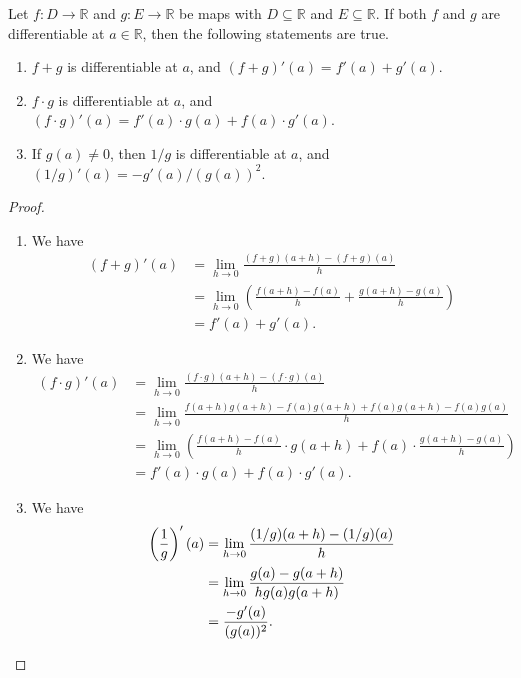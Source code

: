 \begin{theorem}
  Let $f: D \to \mathbb{R}$ and $g: E \to \mathbb{R}$ be maps with
  $D \subseteq \mathbb{R}$ and $E \subseteq \mathbb{R}$.
  If both $f$ and $g$ are differentiable at $a \in \mathbb{R}$, then the
  following statements are true.
  \begin{enumerate}
    \item $f + g$ is differentiable at $a$, and $(f + g)'(a) = f'(a) + g'(a)$.
    \item $f \cdot g$ is differentiable at $a$, and
    $(f \cdot g)'(a) = f'(a) \cdot g(a) + f(a) \cdot g'(a)$.
    \item If $g(a) \neq 0$, then $1 /g$ is differentiable at $a$, and
    $(1 / g)'(a) = -g'(a) / (g(a))^2$.
  \end{enumerate}
\end{theorem}
\begin{proof}
  \leavevmode
  \begin{enumerate}
    \item We have
    \begin{align*}
      (f + g)'(a)
      &= \lim_{h \to 0} \frac{(f + g)(a + h) - (f + g)(a)}{h} \\
      &= \lim_{h \to 0} \left(\frac{f(a + h) - f(a)}{h}
      + \frac{g(a + h) - g(a)}{h}\right) \\[.3em]
      &= f'(a) + g'(a).
    \end{align*}
    \item We have
    \begin{align*}
      (f \cdot g)'(a)
      &= \lim_{h \to 0} \frac{(f \cdot g)(a + h) - (f \cdot g)(a)}{h} \\
      &= \lim_{h \to 0} \frac{f(a + h)g(a + h) - f(a)g(a + h) + f(a)g(a + h)
      - f(a)g(a)}{h} \\
      &= \lim_{h \to 0} \left(\frac{f(a + h) - f(a)}{h} \cdot g(a + h)
      + f(a) \cdot \frac{g(a + h) - g(a)}{h}\right) \\[.3em]
      &= f'(a) \cdot g(a) + f(a) \cdot g'(a).
    \end{align*}
    \item We have
    \begin{align*}
      \left(\frac{1}{g}\right)'(a)
      &= \lim_{h \to 0} \frac{(1/g)(a + h) - (1/g)(a)}{h} \\
      &= \lim_{h \to 0} \frac{g(a) - g(a + h)}{hg(a)g(a + h)} \\
      &= \frac{-g'(a)}{(g(a))^2}.
      \qedhere
    \end{align*}
  \end{enumerate}
\end{proof}

